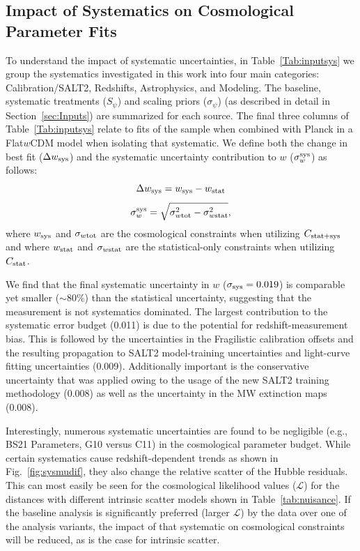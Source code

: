 \documentclass[twocolumn]{aastex63}
\begin{document}
\subsection{Impact of Systematics on Cosmological Parameter Fits}


To understand the impact of systematic uncertainties, in Table~\ref{Tab:inputsys} we group the systematics investigated in this work into four main categories: Calibration/SALT2, Redshifts, Astrophysics, and Modeling. The baseline, systematic treatments ($S_\psi$) and scaling priors ($\sigma_\psi$) (as described in detail in Section~\ref{sec:Inputs}) are summarized for each source. The final three columns of Table~\ref{Tab:inputsys} relate to fits of the sample when combined with Planck \cite{planck} in a Flat$w$CDM model when isolating that systematic. We define both the change in best fit ($\Delta w_{\rm sys}$) and the systematic uncertainty contribution to $w$ ($\sigma_w^{\rm sys}$) as follows:
\begin{equation}
    \Delta w_{\rm sys} =  w_{\rm sys} - w_{\rm stat}
\end{equation}
\vspace{-3mm}
\begin{equation}
    \sigma_w^{\rm sys} = \sqrt{\sigma_{w\rm tot}^2-\sigma_{w\rm stat}^2},
\end{equation}
where $w_{\rm sys}$ and $\sigma_{w\rm tot}$ are the cosmological constraints when utilizing $C_{\rm stat+sys}$ and where $w_{\rm stat}$ and $\sigma_{w\rm stat}$ are the statistical-only constraints when utilizing $C_{\rm stat}$. 

We find that the final systematic uncertainty in $w$ ($\sigma_{\rm sys}=0.019$) is comparable yet smaller ($\sim80\%$) than the statistical uncertainty, suggesting that the measurement is not systematics dominated. The largest contribution to the systematic error budget (0.011) is due to the potential for redshift-measurement bias. This is followed by the uncertainties in the Fragilistic calibration offsets and the resulting propagation to SALT2 model-training uncertainties and light-curve fitting uncertainties (0.009). Additionally important is the conservative uncertainty that was applied owing to the usage of the new SALT2 training methodology (0.008) as well as the uncertainty in the MW extinction maps (0.008). 

 Interestingly, numerous systematic uncertainties are found to be negligible (e.g., BS21 Parameters, G10 versus C11) in the cosmological parameter budget. While certain systematics cause redshift-dependent trends as shown in Fig.~\ref{fig:sysmudif}, they also change the relative scatter of the Hubble residuals.  This can most easily be seen for the cosmological likelihood values ($\mathcal{L}$) for the distances with different intrinsic scatter models shown in Table~\ref{tab:nuisance}.  If the baseline analysis is {significantly preferred (larger $\mathcal{L}$) by the data over one of the analysis variants, the impact of that systematic on cosmological constraints} will be reduced,  as is the case for intrinsic scatter.
\end{document}
